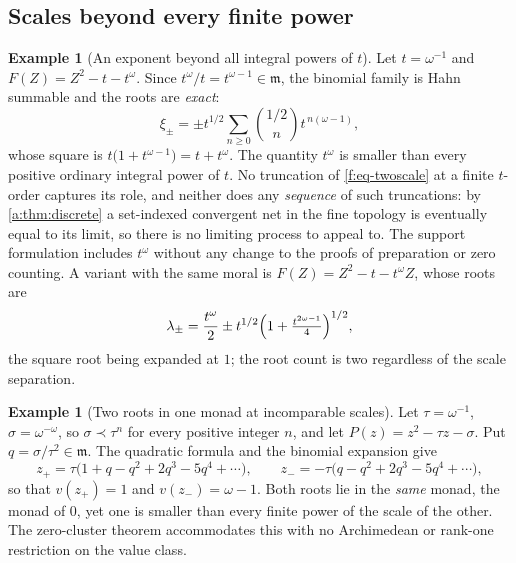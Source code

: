 \documentclass[11pt,a4paper]{article}
\numberwithin{equation}{section}
\theoremstyle{definition}
\newtheorem{example}[theorem]{Example}
\theoremstyle{remark}
\theoremstyle{plain}
\newcommand{\mm}{\mathfrak m}
\begin{document}
\subsection{Scales beyond every finite power}\label{f:sub-scales}

\begin{example}[An exponent beyond all integral powers of
$t$]\label{f:ex-tomega}
Let $t=\omega^{-1}$ and $F(Z)=Z^{2}-t-t^{\omega}$.  Since
$t^{\omega}/t=t^{\omega-1}\in\mm$, the binomial family is Hahn summable
and the roots are \emph{exact}:
\begin{equation}\label{f:eq-twoscale}
 \xi_{\pm}=\pm t^{1/2}\sum_{n\ge0}\binom{1/2}{n}t^{\,n(\omega-1)},
\end{equation}
whose square is $t\bigl(1+t^{\omega-1}\bigr)=t+t^{\omega}$.  The
quantity $t^{\omega}$ is smaller than every positive ordinary integral
power of $t$.  No truncation of \eqref{f:eq-twoscale} at a finite
$t$-order captures its role, and neither does any \emph{sequence} of
such truncations: by \ref{a:thm:discrete} a set-indexed convergent net in
the fine topology is eventually equal to its limit, so there is no
limiting process to appeal to.  The support formulation includes
$t^{\omega}$ without any change to the proofs of preparation or zero
counting.  A variant with the same moral is
$F(Z)=Z^{2}-t-t^{\omega}Z$, whose roots are
\[
 \lambda_{\pm}=\frac{t^{\omega}}{2}
 \pm t^{1/2}\Bigl(1+\tfrac{t^{2\omega-1}}{4}\Bigr)^{1/2},
\]
the square root being expanded at $1$; the root count is two regardless
of the scale separation.
\end{example}

\begin{example}[Two roots in one monad at incomparable
scales]\label{f:ex-incomparable}
Let $\tau=\omega^{-1}$, $\sigma=\omega^{-\omega}$, so
$\sigma\prec\tau^{n}$ for every positive integer $n$, and let
$P(z)=z^{2}-\tau z-\sigma$.  Put $q=\sigma/\tau^{2}\in\mm$.  The
quadratic formula and the binomial expansion give
\[
 z_{+}=\tau\bigl(1+q-q^{2}+2q^{3}-5q^{4}+\cdots\bigr),
 \qquad
 z_{-}=-\tau\bigl(q-q^{2}+2q^{3}-5q^{4}+\cdots\bigr),
\]
so that $v(z_{+})=1$ and $v(z_{-})=\omega-1$.  Both roots lie in the
\emph{same} monad, the monad of $0$, yet one is smaller than every
finite power of the scale of the other.  The zero-cluster theorem
accommodates this with no Archimedean or rank-one restriction on the
value class.
\end{example}
\end{document}
